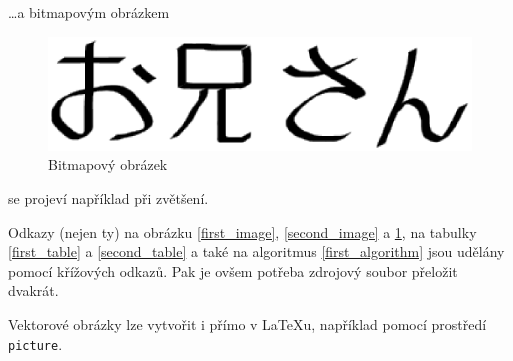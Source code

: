 \documentclass[a4paper, 11pt]{article}
\begin{document}
    \dots a bitmapovým obrázkem
    
    \begin{figure}[h]
        \centering
        \includegraphics[scale=0.8]{oniisan2.eps}
        \caption{Bitmapový obrázek}
        \label{third_image}
    \end{figure}
    
    \noindent
    se projeví například při zvětšení.
    
    Odkazy (nejen ty) na obrázku \ref{first_image}, \ref{second_image} a \ref{third_image}, na tabulky \ref{first_table} a \ref{second_table} a také na algoritmus \ref{first_algorithm} jsou udělány pomocí křížových odkazů. Pak je ovšem potřeba zdrojový soubor přeložit dvakrát.
    
    Vektorové obrázky lze vytvořit i přímo v \LaTeX u, například pomocí prostředí \texttt{picture}.
    
\end{document}

